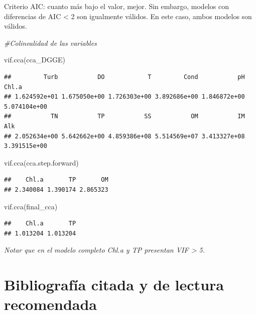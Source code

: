 \documentclass[
]{book}
\newenvironment{Shaded}{\begin{snugshade}}{\end{snugshade}}
\newcommand{\CommentTok}[1]{\textcolor[rgb]{0.56,0.35,0.01}{\textit{#1}}}
\newcommand{\FunctionTok}[1]{\textcolor[rgb]{0.00,0.00,0.00}{#1}}
\newcommand{\NormalTok}[1]{#1}
\begin{document}
Criterio AIC: cuanto más bajo el valor, mejor. Sin embargo, modelos con diferencias de AIC \textless{} 2 son igualmente válidos. En este caso, ambos modelos son válidos.

\begin{Shaded}
\begin{Highlighting}[]
\CommentTok{\#Colinealidad de las variables}

\FunctionTok{vif.cca}\NormalTok{(cca\_DGGE)}
\end{Highlighting}
\end{Shaded}

\begin{verbatim}
##         Turb           DO            T         Cond           pH        Chl.a 
## 1.624592e+01 1.675050e+00 1.726303e+00 3.892686e+00 1.846872e+00 5.074104e+00 
##           TN           TP           SS           OM           IM          Alk 
## 2.052634e+00 5.642662e+00 4.859386e+08 5.514569e+07 3.413327e+08 3.391515e+00
\end{verbatim}

\begin{Shaded}
\begin{Highlighting}[]
\FunctionTok{vif.cca}\NormalTok{(cca.step.forward)}
\end{Highlighting}
\end{Shaded}

\begin{verbatim}
##    Chl.a       TP       OM 
## 2.340084 1.390174 2.865323
\end{verbatim}

\begin{Shaded}
\begin{Highlighting}[]
\FunctionTok{vif.cca}\NormalTok{(final\_cca)}
\end{Highlighting}
\end{Shaded}

\begin{verbatim}
##    Chl.a       TP 
## 1.013204 1.013204
\end{verbatim}

\emph{Notar que en el modelo completo Chl.a y TP presentan VIF \textgreater{} 5.}

\hypertarget{bibliografuxeda-citada-y-de-lectura-recomendada}{%
\section{Bibliografía citada y de lectura recomendada}\label{bibliografuxeda-citada-y-de-lectura-recomendada}}
\end{document}
